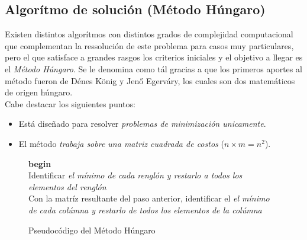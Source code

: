 \documentclass[letterpaper, 12pt]{article}
\begin{document}
    \subsection{Algorítmo de solución (Método Húngaro)}
    Existen distintos algorítmos con distintos grados de complejidad computacional que complementan la ressolución de este problema para casos muy particulares, pero el que satisface a grandes rasgos los criterios iniciales y el objetivo a llegar es el
    \emph{Método Húngaro}. Se le denomina como tál gracias a que los primeros aportes al método fueron de Dénes König y Jenő Egerváry, los cuales son dos matemáticos de origen húngaro. \\Cabe destacar los siguientes puntos:
    \begin{itemize}
        \item Está diseñado para resolver \emph{problemas de minimización unicamente}.
        \item El método \emph{trabaja sobre una matriz cuadrada de costos} (\(n\times m=n^2\)).
    \end{itemize}
    \begin{figure}[H]
          \begin{algorithm}[H]
            \SetAlgoLined
            \textbf{begin\\}
            Identificar \emph{el mínimo de cada renglón y restarlo a todos los elementos del renglón}\\
            Con la matríz resultante del paso anterior, identificar el \emph{el mínimo de cada colúmna y restarlo de todos los elementos de la colúmna}\\
        \end{algorithm}
        \caption{Pseudocódigo del Método Húngaro}
    \end{figure}
\end{document}
